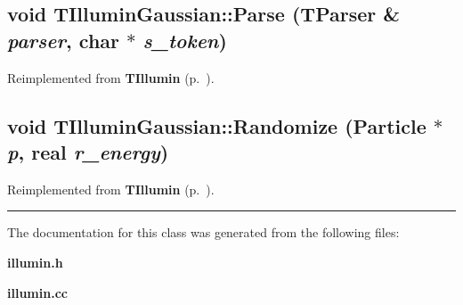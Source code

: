 \label{TIlluminGaussian_a1}
\subsection{\setlength{\rightskip}{0pt plus 5cm}void TIllumin\-Gaussian::Parse ({\bf TParser} \& {\em parser}, char $\ast$ {\em s\_\-token})\hspace{0.3cm}{\tt  [virtual]}}



Reimplemented from {\bf TIllumin} {\rm (p.~\pageref{TIllumin_a0})}.\label{TIlluminGaussian_a2}
\subsection{\setlength{\rightskip}{0pt plus 5cm}void TIllumin\-Gaussian::Randomize ({\bf Particle} $\ast$ {\em p}, {\bf real} {\em r\_\-energy})\hspace{0.3cm}{\tt  [virtual]}}



Reimplemented from {\bf TIllumin} {\rm (p.~\pageref{TIllumin_a1})}.\vspace{0.4cm}\hrule\vspace{0.2cm}
The documentation for this class was generated from the following files:\begin{CompactItemize}
\item 
{\bf illumin.h}\item 
{\bf illumin.cc}\end{CompactItemize}

